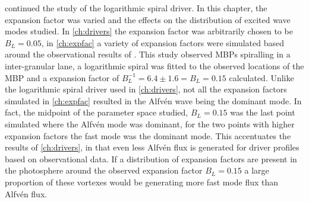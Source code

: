  continued the study of the logarithmic spiral driver.
In this chapter, the expansion factor was varied and the effects on the distribution of excited wave modes studied.
In \cref{ch:drivers} the expansion factor was arbitrarily chosen to be $B_L = 0.05$, in \cref{ch:expfac} a variety of expansion factors were simulated based around the observational results of \cite{bonet2008}.
This study observed MBPs spiralling in a inter-granular lane, a logarithmic spiral was fitted to the observed locations of the MBP and a expansion factor of $B_L^{-1} = 6.4 \pm 1.6 = B_L = 0.15$ calculated.
Unlike the logarithmic spiral driver used in \cref{ch:drivers}, not all the expansion factors simulated in \cref{ch:expfac} resulted in the Alfv\'en wave being the dominant mode.
In fact, the midpoint of the parameter space studied, $B_L = 0.15$ was the last point simulated where the Alfv\'en mode was dominant, for the two points with higher expansion factors the fast mode was the dominant mode.
This accentuates the results of \cref{ch:drivers}, in that even less Alfv\'en flux is generated for driver profiles based on observational data.
If a distribution of expansion factors are present in the photosphere around the observed expansion factor $B_L = 0.15$ a large proportion of these vortexes would be generating more fast mode flux than Alfv\'en flux.


